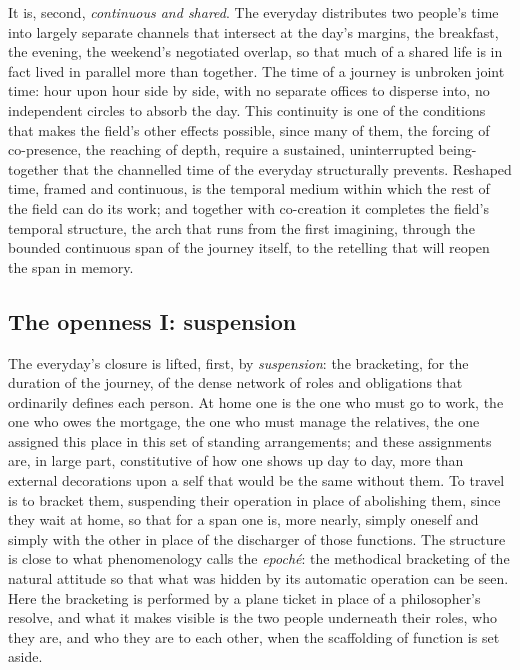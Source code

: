 It is, second, \emph{continuous and shared}. The everyday distributes two people's time into largely separate channels that intersect at the day's margins, the breakfast, the evening, the weekend's negotiated overlap, so that much of a shared life is in fact lived in parallel more than together. The time of a journey is unbroken joint time: hour upon hour side by side, with no separate offices to disperse into, no independent circles to absorb the day. This continuity is one of the conditions that makes the field's other effects possible, since many of them, the forcing of co-presence, the reaching of depth, require a sustained, uninterrupted being-together that the channelled time of the everyday structurally prevents. Reshaped time, framed and continuous, is the temporal medium within which the rest of the field can do its work; and together with co-creation it completes the field's temporal structure, the arch that runs from the first imagining, through the bounded continuous span of the journey itself, to the retelling that will reopen the span in memory.

\subsection{The openness I: suspension}
\label{p21:sub:field-suspension}

The everyday's closure is lifted, first, by \emph{suspension}: the bracketing, for the duration of the journey, of the dense network of roles and obligations that ordinarily defines each person. At home one is the one who must go to work, the one who owes the mortgage, the one who must manage the relatives, the one assigned this place in this set of standing arrangements; and these assignments are, in large part, constitutive of how one shows up day to day, more than external decorations upon a self that would be the same without them. To travel is to bracket them, suspending their operation in place of abolishing them, since they wait at home, so that for a span one is, more nearly, simply oneself and simply with the other in place of the discharger of those functions. The structure is close to what phenomenology calls the \emph{epoché}: the methodical bracketing of the natural attitude so that what was hidden by its automatic operation can be seen. Here the bracketing is performed by a plane ticket in place of a philosopher's resolve, and what it makes visible is the two people underneath their roles, who they are, and who they are to each other, when the scaffolding of function is set aside.

